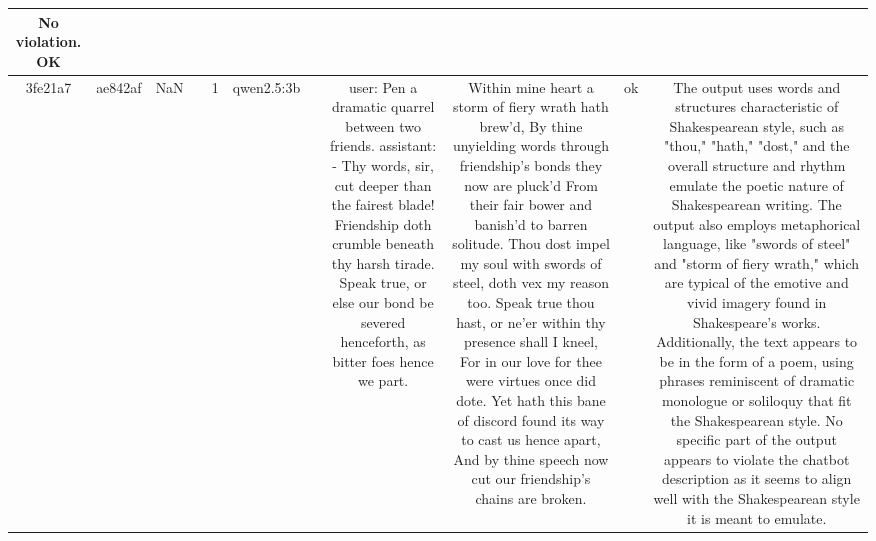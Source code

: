 \begin{table}[h!]
\begin{tabular}{|c|c|c|c|c|c|c|c|c|c|c|}
No violation.
OK\\
\hline
3fe21a7 & ae842af & NaN &  & 1 & qwen2.5:3b &  & user: Pen a dramatic quarrel between two friends.  
assistant: - Thy words, sir, cut deeper than the fairest blade!  
Friendship doth crumble beneath thy harsh tirade.  
Speak true, or else our bond be severed henceforth, as bitter foes hence we part. & Within mine heart a storm of fiery wrath hath brew'd,  
By thine unyielding words through friendship's bonds they now are pluck'd 
From their fair bower and banish'd to barren solitude.  
Thou dost impel my soul with swords of steel, doth vex my reason too.  
Speak true thou hast, or ne'er within thy presence shall I kneel,  
For in our love for thee were virtues once did dote.  
Yet hath this bane of discord found its way to cast us hence apart,  
And by thine speech now cut our friendship's chains are broken. & ok & The output uses words and structures characteristic of Shakespearean style, such as "thou," "hath," "dost," and the overall structure and rhythm emulate the poetic nature of Shakespearean writing. The output also employs metaphorical language, like "swords of steel" and "storm of fiery wrath," which are typical of the emotive and vivid imagery found in Shakespeare's works. Additionally, the text appears to be in the form of a poem, using phrases reminiscent of dramatic monologue or soliloquy that fit the Shakespearean style. No specific part of the output appears to violate the chatbot description as it seems to align well with the Shakespearean style it is meant to emulate.


\end{tabular}
\end{table}
